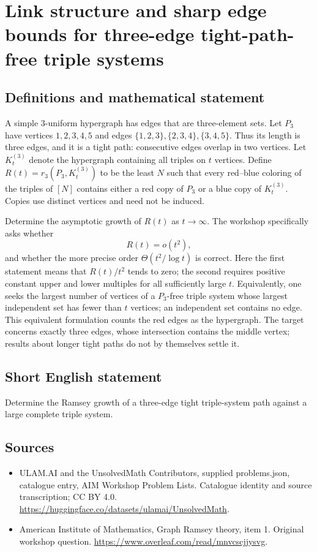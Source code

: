 \documentclass[11pt,a4paper]{article}
\begin{document}
\section*{Link structure and sharp edge bounds for three-edge tight-path-free triple systems}\label{statement}

\subsection{Definitions and mathematical statement}
A simple $3$-uniform hypergraph has edges that are three-element sets.
Let $P_3$ have vertices $1,2,3,4,5$ and edges
$\{1,2,3\},\{2,3,4\},\{3,4,5\}$. Thus its length is three edges,
and it is a tight path: consecutive edges overlap in two vertices.
Let $K_t^{(3)}$ denote the hypergraph containing all triples on $t$
vertices. Define $R(t)=r_3(P_3,K_t^{(3)})$ to be the least $N$ such
that every red--blue coloring of the triples of $[N]$ contains either
a red copy of $P_3$ or a blue copy of $K_t^{(3)}$.
Copies use distinct vertices and need not be induced.

Determine the asymptotic growth of $R(t)$ as $t\to\infty$.
The workshop specifically asks whether
\[
                         R(t)=o(t^2),
\]
and whether the more precise order $\Theta(t^2/\log t)$ is correct.
Here the first statement means that $R(t)/t^2$ tends to zero; the
second requires positive constant upper and lower multiples for all
sufficiently large $t$.
Equivalently, one seeks the largest number of vertices of a
$P_3$-free triple system whose largest independent set has fewer than
$t$ vertices; an independent set contains no edge. This equivalent
formulation counts the red edges as the hypergraph. The target concerns
exactly three edges, whose intersection contains the middle vertex;
results about longer tight paths do not by themselves settle it.
\subsection{Short English statement}
Determine the Ramsey growth of a three-edge tight triple-system path against a large complete triple system.
\subsection{Sources}
\begin{itemize}
\item[S1] ULAM.AI and the UnsolvedMath Contributors, supplied problems.json, catalogue entry, AIM Workshop Problem Lists. Catalogue identity and source transcription; CC BY 4.0.
\url{https://huggingface.co/datasets/ulamai/UnsolvedMath}.
\item[S2] American Institute of Mathematics, Graph Ramsey theory, item 1. Original workshop question.
\url{https://www.overleaf.com/read/mnvcscjjysvg}.
\end{itemize}
\end{document}
